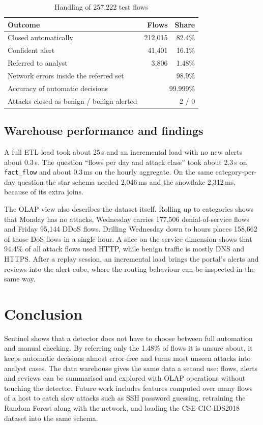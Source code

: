 \documentclass[conference]{IEEEtran}
\begin{document}
\begin{table}[t]
\centering
\caption{Handling of 257,222 test flows}
\label{tab:route}
\begin{tabular}{lrr}
\toprule
Outcome & Flows & Share \\
\midrule
Closed automatically & 212,015 & 82.4\% \\
Confident alert & 41,401 & 16.1\% \\
Referred to analyst & 3,806 & 1.48\% \\
\midrule
Network errors inside the referred set & \multicolumn{2}{r}{98.9\%} \\
Accuracy of automatic decisions & \multicolumn{2}{r}{99.999\%} \\
Attacks closed as benign / benign alerted & \multicolumn{2}{r}{2 / 0} \\
\bottomrule
\end{tabular}
\end{table}

\subsection{Warehouse performance and findings}
A full ETL load took about 25\,s and an incremental load with no new alerts about 0.3\,s. The
question ``flows per day and attack class'' took about 2.3\,s on \texttt{fact\_flow} and about
0.3\,ms on the hourly aggregate. On the same category-per-day question the star schema needed
2,046\,ms and the snowflake 2,312\,ms, because of its extra joins.

The OLAP view also describes the dataset itself. Rolling up to categories shows that Monday has
no attacks, Wednesday carries 177,506 denial-of-service flows and Friday 95,144 DDoS flows.
Drilling Wednesday down to hours places 158,662 of those DoS flows in a single hour. A slice on
the service dimension shows that 94.4\% of all attack flows used HTTP, while benign traffic is
mostly DNS and HTTPS. After a replay session, an incremental load brings the portal's alerts
and reviews into the alert cube, where the routing behaviour can be inspected in the same way.

\section{Conclusion}
Sentinel shows that a detector does not have to choose between full automation and manual
checking. By referring only the 1.48\% of flows it is unsure about, it keeps automatic decisions
almost error-free and turns most unseen attacks into analyst cases. The data warehouse gives the
same data a second use: flows, alerts and reviews can be summarised and explored with OLAP
operations without touching the detector. Future work includes features computed over many flows
of a host to catch slow attacks such as SSH password guessing, retraining the Random Forest along
with the network, and loading the CSE-CIC-IDS2018 dataset into the same schema.
\end{document}
